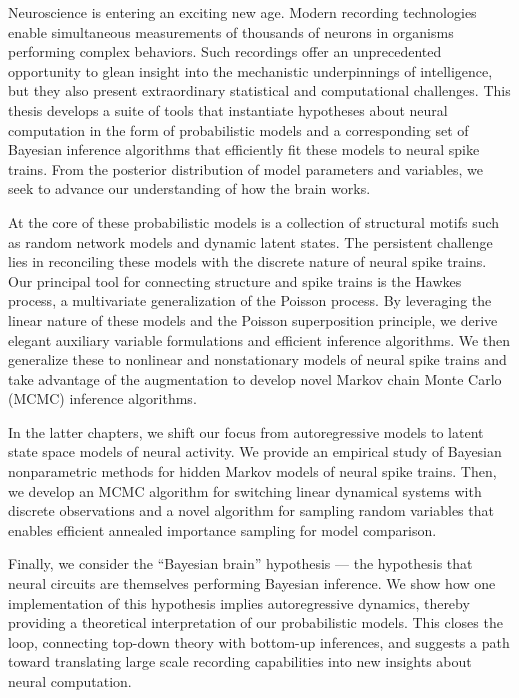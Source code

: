 Neuroscience is entering an exciting new age.  Modern recording
technologies enable simultaneous measurements of
thousands of neurons in organisms performing complex behaviors.  Such
recordings offer an unprecedented opportunity to glean insight into
the mechanistic underpinnings of intelligence, but they also present
extraordinary statistical and computational challenges.
This thesis develops a suite of tools that instantiate
hypotheses about neural computation in the form of
probabilistic models and a corresponding set of Bayesian inference
algorithms that efficiently fit these models to neural spike trains.
From the posterior distribution of model parameters and variables,
we seek to advance our understanding of how the brain works. 

At the core of these probabilistic models is a collection of
structural motifs such as random network models and dynamic latent states. The
persistent challenge lies in reconciling these models with the
discrete nature of neural spike trains.  Our principal tool for
connecting structure and spike trains is the Hawkes process, a
multivariate generalization of the Poisson process.  By
leveraging the linear nature of these models and the Poisson
superposition principle, we derive elegant auxiliary variable
formulations and efficient inference algorithms. We then generalize
these to nonlinear and nonstationary models of neural spike trains and
take advantage of the \polyagamma augmentation to develop novel
Markov chain Monte Carlo (MCMC) inference algorithms.

In the latter chapters, we shift our focus from autoregressive models
to latent state space models of neural activity. We provide an
empirical study of Bayesian nonparametric methods for hidden Markov
models of neural spike trains. Then, we develop an MCMC algorithm for switching
linear dynamical systems with discrete observations and a novel
algorithm for sampling \polyagamma random variables that enables 
efficient annealed importance sampling for model comparison.

Finally, we consider the ``Bayesian brain'' hypothesis --- the
hypothesis that neural circuits are themselves performing Bayesian
inference.  We show how one implementation of this
hypothesis implies autoregressive dynamics, thereby providing a theoretical interpretation of
our probabilistic models.  This closes the
loop, connecting top-down theory with bottom-up inferences, and
suggests a path toward translating large scale recording
capabilities into new insights about neural computation.


